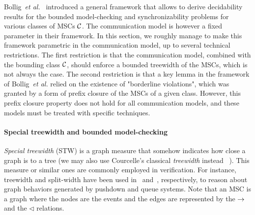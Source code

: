 Bollig~\emph{et al.}~\cite{BolligGFLLS21} introduced a general framework that allows to derive decidability results 
for the bounded model-checking and synchronizability problems
for various classes of MSCs $\mathcal{C}$. The communication model is however a fixed parameter
in their framework.
In this section, we roughly manage to make this framework parametric in the communication
model, up to several technical restrictions. The first restriction is that the communication
model, combined with the bounding class $\mathcal{C}$, should enforce a bounded treewidth of the
MSCs, which is not always the case. The second restriction is that a key lemma in the framework
of  Bollig~\emph{et al.} relied on the existence of "borderline violations", which was granted
by a form of prefix closure of the MSCs of a given class. However, this prefix closure property
does not hold for all communication models, and these models must be treated with specific
techniques.

\paragraph{\bf Special treewidth and bounded model-checking}
\emph{Special treewidth} (STW)
is a graph measure that somehow indicates how close
a graph is to a tree (we may also use Courcelle's classical \emph{treewidth} instead~ \cite{Courcelle10}).
This measure or similar ones are commonly employed in verification. For instance, treewidth and split-width have been used in~\cite{MadhusudanP11} and~\cite{DBLP:conf/concur/CyriacGK12,AiswaryaGK14}, respectively, to reason about graph behaviors generated by pushdown and queue systems.
Note that an MSC is a graph where the nodes are the events and the edges are represented by the $\to$ and the $\lhd$ relations.

